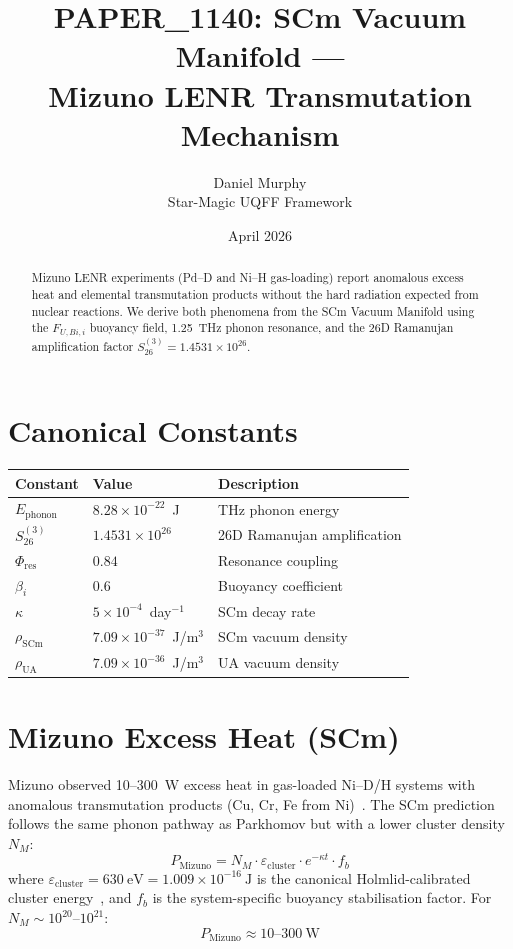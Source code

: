 \documentclass[11pt,a4paper]{article}
\title{PAPER\_1140: SCm Vacuum Manifold ---\\Mizuno LENR Transmutation Mechanism}
\author{Daniel Murphy\\Star-Magic UQFF Framework}
\date{April 2026}
\begin{document}
\maketitle

\begin{abstract}
Mizuno LENR experiments (Pd--D and Ni--H gas-loading) report anomalous excess heat
and elemental transmutation products without the hard radiation expected from nuclear
reactions. We derive both phenomena from the SCm Vacuum Manifold using the
$F_{U,Bi,i}$ buoyancy field, 1.25~THz phonon resonance, and the 26D Ramanujan
amplification factor $S_{26}^{(3)} = 1.4531\times10^{26}$.
\end{abstract}

\section{Canonical Constants}
\begin{center}
\begin{tabular}{@{}lll@{}}
\toprule
Constant & Value & Description \\ \midrule
$E_{\text{phonon}}$ & $8.28\times10^{-22}$~J & THz phonon energy \\
$S_{26}^{(3)}$ & $1.4531\times10^{26}$ & 26D Ramanujan amplification \\
$\Phi_{\text{res}}$ & $0.84$ & Resonance coupling \\
$\beta_i$ & $0.6$ & Buoyancy coefficient \\
$\kappa$ & $5\times10^{-4}$~day$^{-1}$ & SCm decay rate \\
$\rho_{\text{SCm}}$ & $7.09\times10^{-37}$~J/m$^3$ & SCm vacuum density \\
$\rho_{\text{UA}}$ & $7.09\times10^{-36}$~J/m$^3$ & UA vacuum density \\
\bottomrule
\end{tabular}
\end{center}

\section{Mizuno Excess Heat (SCm)}
Mizuno observed 10--300~W excess heat in gas-loaded Ni--D/H systems with anomalous
transmutation products (Cu, Cr, Fe from
Ni)~\cite{mizuno2016,mizuno1998}. The SCm prediction follows the same
phonon pathway as Parkhomov but with a lower cluster density $N_M$:
\begin{equation}\label{eq:mizuno}
P_{\text{Mizuno}} = N_M\cdot\varepsilon_{\text{cluster}}\cdot e^{-\kappa t}\cdot f_b
\end{equation}
where $\varepsilon_{\text{cluster}}=630\ \text{eV}=1.009\times10^{-16}\ \text{J}$
is the canonical Holmlid-calibrated cluster
energy~\cite{holmlid2013,holmlid2015}, and $f_b$ is the system-specific buoyancy
stabilisation factor. For $N_M\sim10^{20}$--$10^{21}$:
\begin{equation}\label{eq:mizuno_result}
\boxed{P_{\text{Mizuno}} \approx 10\text{--}300\ \text{W}}
\end{equation}
\end{document}
